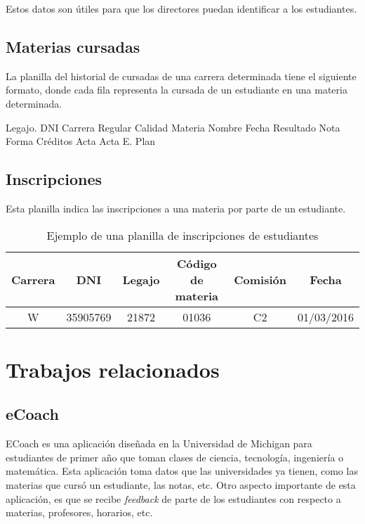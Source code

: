 Estos datos son útiles para que los directores puedan identificar a los estudiantes.

\subsection[Materias cursadas]{Materias cursadas}

La planilla del historial de cursadas de una carrera determinada tiene el siguiente formato, donde cada fila representa la cursada de un estudiante en una materia determinada.

\begin{outline}
    \2 Legajo.
    \2 DNI 
    \2 Carrera 
    \2 Regular 
    \2 Calidad 
    \2 Materia 
    \2 Nombre 
    \2 Fecha 
    \2 Resultado 
    \2 Nota 
    \2 Forma 
    \2 Créditos
    \2 Acta 
    \2 Acta E. 
    \2 Plan
\end{outline}

\subsection[Inscripciones]{Inscripciones}

Esta planilla indica las inscripciones a una materia por parte de un estudiante.

\begin{table}[!htbp]
    \centering
    \makegapedcells
    \begin{tabular}{|c|c|c|c|c|c|}
    \hline
    Carrera & DNI & Legajo & Código de materia & Comisión & Fecha  \\\hline
    W & 35905769 & 21872 & 01036 & C2 & 01/03/2016  \\
    \hline
    \end{tabular}
    \caption{Ejemplo de una planilla de inscripciones de estudiantes}
    \label{tab:tabla_datos}
\end{table}


\section[Trabajos relacionados]{Trabajos relacionados}

\subsection[eCoach]{eCoach}
ECoach es una aplicación diseñada en la Universidad de Michigan para estudiantes de primer año que toman clases de ciencia, tecnología, ingeniería o matemática. Esta aplicación toma datos que las universidades ya tienen, como las materias que cursó un estudiante, las notas, etc.
Otro aspecto importante de esta aplicación, es que se recibe \textit{feedback} de parte de los estudiantes con respecto a materias, profesores, horarios, etc.

